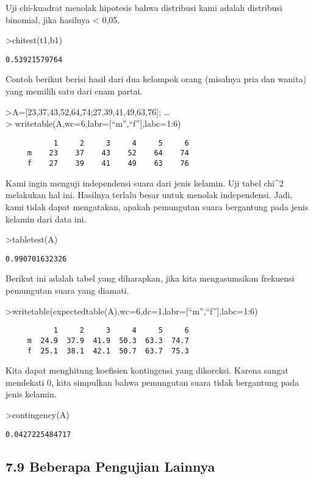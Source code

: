 \documentclass[
]{book}
\begin{document}
Uji chi-kuadrat menolak hipotesis bahwa distribusi kami adalah distribusi binomial, jika hasilnya \textless{} 0,05.

\textgreater chitest(t1,b1)

\begin{verbatim}
0.53921579764
\end{verbatim}

Contoh berikut berisi hasil dari dua kelompok orang (misalnya pria dan wanita) yang memilih satu dari enam partai.

\textgreater A={[}23,37,43,52,64,74;27,39,41,49,63,76{]}; \ldots{}\\
\textgreater{} writetable(A,wc=6,labr={[}``m'',``f''{]},labc=1:6)

\begin{verbatim}
           1     2     3     4     5     6
     m    23    37    43    52    64    74
     f    27    39    41    49    63    76
\end{verbatim}

Kami ingin menguji independensi suara dari jenis kelamin. Uji tabel chi\^{}2 melakukan hal ini. Hasilnya terlalu besar untuk menolak independensi. Jadi, kami tidak dapat mengatakan, apakah pemungutan suara bergantung pada jenis kelamin dari data ini.

\textgreater tabletest(A)

\begin{verbatim}
0.990701632326
\end{verbatim}

Berikut ini adalah tabel yang diharapkan, jika kita mengasumsikan frekuensi pemungutan suara yang diamati.

\textgreater writetable(expectedtable(A),wc=6,dc=1,labr={[}``m'',``f''{]},labc=1:6)

\begin{verbatim}
           1     2     3     4     5     6
     m  24.9  37.9  41.9  50.3  63.3  74.7
     f  25.1  38.1  42.1  50.7  63.7  75.3
\end{verbatim}

Kita dapat menghitung koefisien kontingensi yang dikoreksi. Karena sangat mendekati 0, kita simpulkan bahwa pemungutan suara tidak bergantung pada jenis kelamin.

\textgreater contingency(A)

\begin{verbatim}
0.0427225484717
\end{verbatim}

\subsection{7.9 Beberapa Pengujian Lainnya}\label{beberapa-pengujian-lainnya}
\end{document}
